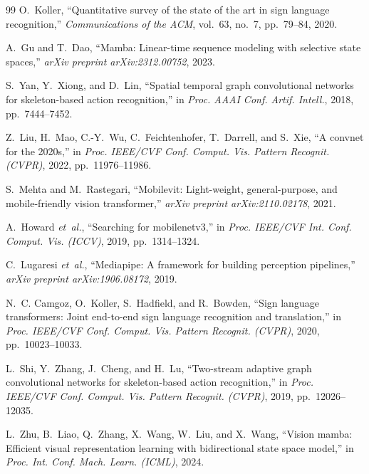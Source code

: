 \documentclass[journal]{IEEEtran}
\begin{document}

\begin{thebibliography}{99}
O.~Koller, ``Quantitative survey of the state of the art in sign language recognition,'' \emph{Communications of the ACM}, vol.~63, no.~7, pp.~79--84, 2020.

A.~Gu and T.~Dao, ``Mamba: Linear-time sequence modeling with selective state spaces,'' \emph{arXiv preprint arXiv:2312.00752}, 2023.

S.~Yan, Y.~Xiong, and D.~Lin, ``Spatial temporal graph convolutional networks for skeleton-based action recognition,'' in \emph{Proc. AAAI Conf. Artif. Intell.}, 2018, pp.~7444--7452.

Z.~Liu, H.~Mao, C.-Y.~Wu, C.~Feichtenhofer, T.~Darrell, and S.~Xie, ``A convnet for the 2020s,'' in \emph{Proc. IEEE/CVF Conf. Comput. Vis. Pattern Recognit. (CVPR)}, 2022, pp.~11976--11986.

S.~Mehta and M.~Rastegari, ``Mobilevit: Light-weight, general-purpose, and mobile-friendly vision transformer,'' \emph{arXiv preprint arXiv:2110.02178}, 2021.

A.~Howard \emph{et~al.}, ``Searching for mobilenetv3,'' in \emph{Proc. IEEE/CVF Int. Conf. Comput. Vis. (ICCV)}, 2019, pp.~1314--1324.

C.~Lugaresi \emph{et~al.}, ``Mediapipe: A framework for building perception pipelines,'' \emph{arXiv preprint arXiv:1906.08172}, 2019.

N.~C. Camgoz, O.~Koller, S.~Hadfield, and R.~Bowden, ``Sign language transformers: Joint end-to-end sign language recognition and translation,'' in \emph{Proc. IEEE/CVF Conf. Comput. Vis. Pattern Recognit. (CVPR)}, 2020, pp.~10023--10033.

L.~Shi, Y.~Zhang, J.~Cheng, and H.~Lu, ``Two-stream adaptive graph convolutional networks for skeleton-based action recognition,'' in \emph{Proc. IEEE/CVF Conf. Comput. Vis. Pattern Recognit. (CVPR)}, 2019, pp.~12026--12035.

L.~Zhu, B.~Liao, Q.~Zhang, X.~Wang, W.~Liu, and X.~Wang, ``Vision mamba: Efficient visual representation learning with bidirectional state space model,'' in \emph{Proc. Int. Conf. Mach. Learn. (ICML)}, 2024.
\end{thebibliography}
\end{document}
